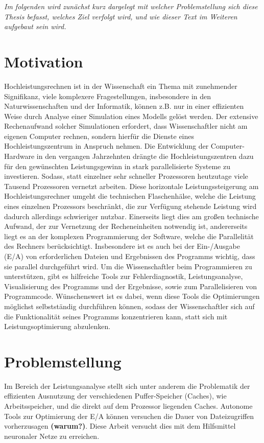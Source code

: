 \documentclass[
	12pt,
	a4paper,
	BCOR10mm,
	DIV14,
	listof=totoc,
	bibliography=totoc,
	headsepline
]{scrreprt}
\begin{document}
\textit{%
Im folgenden wird zunächst kurz dargelegt mit welcher Problemstellung sich diese Thesis befasst, welches Ziel verfolgt wird, und wie dieser Text im Weiteren aufgebaut sein wird.
}
\bigskip

\section{Motivation}

Hochleistungsrechnen ist in der Wissenschaft ein Thema mit zunehmender Signifikanz, viele komplexere Fragestellungen, insbesondere in den Naturwissenschaften und der Informatik, können z.B. nur in einer effizienten Weise durch Analyse einer Simulation eines Modells gelöst werden. Der extensive Rechenaufwand solcher Simulationen erfordert, dass Wissenschaftler nicht am eigenen Computer rechnen, sondern hierfür die Dienste eines Hochleistungszentrum in Anspruch nehmen. 
Die Entwicklung der Computer-Hardware in den vergangen Jahrzehnten drängte die Hochleistungszentren dazu für den gewünschten Leistungsgewinn in stark parallelisierte Systeme zu investieren. Sodass, statt einzelner sehr schneller Prozessoren heutzutage viele Tausend Prozessoren vernetzt arbeiten. Diese horizontale Leistungssteigerung am Hochleistungsrechner umgeht die technischen Flaschenhälse, welche die Leistung eines einzelnen Prozessors beschränkt, die zur Verfügung stehende Leistung wird dadurch allerdings schwieriger nutzbar. 
Einerseits liegt dies am großen  technische Aufwand, der zur Vernetzung der Recheneinheiten notwendig ist, andererseits liegt es an der komplexen Programmierung der Software, welche die Parallelität des Rechners berücksichtigt. Insbesondere ist es auch bei der Ein-/Ausgabe (E/A) von erforderlichen Dateien und Ergebnissen des Programms wichtig, dass sie parallel durchgeführt wird.
Um die Wissenschaftler beim Programmieren zu unterstützen, gibt es hilfreiche Tools zur Fehlerdiagnostik, Leistungsanalyse, Visualisierung des Programms und der Ergebnisse, sowie zum Parallelisieren von Programmcode. Wünschenswert ist es dabei, wenn diese Tools die Optimierungen möglichst selbstständig durchführen können, sodass der Wissenschaftler sich auf die Funktionalität seines Programms konzentrieren kann, statt sich mit Leistungsoptimierung abzulenken.

\section{Problemstellung}

Im Bereich der Leistungsanalyse stellt sich unter anderem die Problematik der effizienten Ausnutzung der verschiedenen Puffer-Speicher (Caches), wie Arbeitsspeicher, und die direkt auf dem Prozessor liegenden Caches. Autonome Tools zur Optimierung der E/A können versuchen die Dauer von Dateizugriffen vorherzusagen \textbf{(warum?)}. Diese Arbeit versucht dies mit dem Hilfsmittel neuronaler Netze zu erreichen. 
\end{document}
